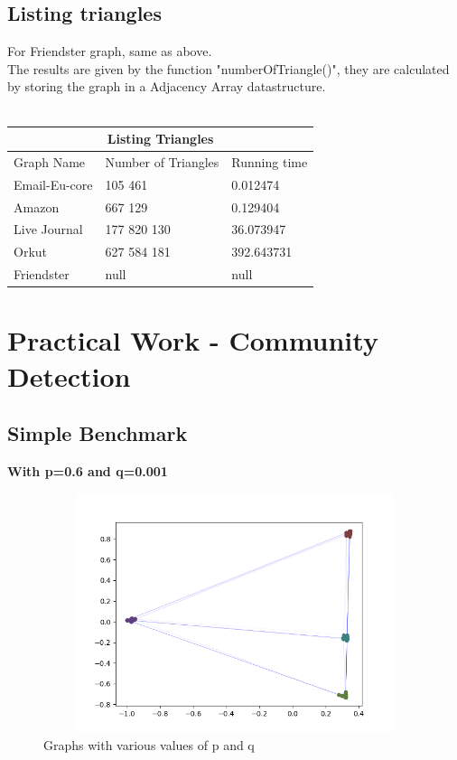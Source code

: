 \documentclass{article}
\begin{document}
\subsection{Listing triangles}
For Friendster graph, same as above.\\
The results are given by the function "numberOfTriangle()", they are calculated by storing the graph in a Adjacency Array datastructure.\\ \\
\begin{tabular}{ |p{3.7cm}||p{3.7cm}|p{3.7cm}|  }
 \hline
 \multicolumn{3}{|c|}{ Listing Triangles } \\
 \hline
 Graph Name & Number of Triangles & Running time\\
 \hline
 Email-Eu-core & 105 461 & 0.012474\\
 Amazon & 667 129 & 0.129404 \\
 Live Journal & 177 820 130 & 36.073947\\
 Orkut & 627 584 181 & 392.643731\\
 Friendster & null  & null\\
 \hline
\end{tabular}

\clearpage

\section{Practical Work - Community Detection}
\subsection{Simple Benchmark}

\textbf{With p=0.6 and q=0.001}
\begin{figure}[h!]
\includegraphics[width=12cm, height=7cm]{Figure_1.png}
  \caption{Graphs with various values of p and q}
\end{figure}
\FloatBarrier
\end{document}
